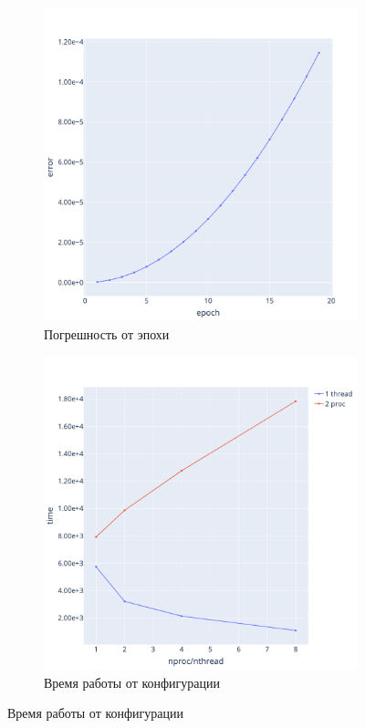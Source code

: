 \documentclass[a4paper,hidelinks,12pt]{article}
\begin{document}
\begin{figure}[H]
\begin{subfigure}{.5\textwidth}
  \centering
  \includegraphics[width=\linewidth]{pictures/Lpi_128_errs.png}
  \caption{Погрешность от эпохи}
\end{subfigure}%
\begin{subfigure}{.5\textwidth}
  \centering
  \includegraphics[width=\linewidth]{pictures/Lpi_128_perf.png}
  \caption{Время работы от конфигурации}
\end{subfigure}%
\end{figure}
\end{document}
